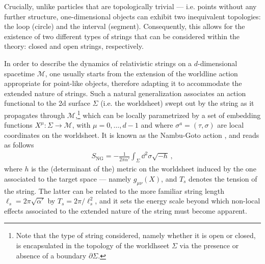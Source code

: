 Crucially, unlike particles that are topologically trivial --- i.e. points without any further structure, one-dimensional objects can exhibit two inequivalent topologies: the loop (circle) and the interval (segment). Consequently, this allows for the existence of two different types of strings that can be considered within the theory: closed and open strings, respectively.

In order to describe the dynamics of relativistic strings on a $d$-dimensional spacetime $\mathcal{M}$, one usually starts from the extension of the worldline action appropriate for point-like objects, therefore adapting it to accommodate the extended nature of strings. Such a natural generalization associates an action functional to the 2d surface $\Sigma$ (i.e. the worldsheet) swept out by the string as it propagates through $\mathcal{M}$,\footnote{Note that the type of string considered, namely whether it is open or closed, is encapsulated in the topology of the worldhseet $\Sigma$ via the presence or absence of a boundary $\partial \Sigma$.} which can be locally parametrized by a set of embedding functions $X^\mu : \Sigma \to \mathcal{M}$, with $\mu=0,\dots, d-1$ and where $\sigma^a=(\tau, \sigma)$ are local coordinates on the worldsheet. It is known as the Nambu-Goto action \cite{Nambu:1986ze, Goto:1971ce}, and reads as follows
%
\begin{align}\label{eq:NambuGoto}
 S_{\text{NG}} = -\frac{1}{2\pi \alpha'} \int_\Sigma \dd^2 \sigma \sqrt{-h}\, , 
\end{align}
%
where $h$ is the (determinant of the) metric on the worldsheet induced by the one associated to the target space --- namely $g_{\mu \nu} (X)$, and $T_s$ denotes the tension of the string. The latter can be related to the more familiar string length $\ell_s=2\pi \sqrt{\alpha'}$ by $T_s=2\pi/\ell_s^2$, and it sets the energy scale beyond which non-local effects associated to the extended nature of the string must become apparent.

